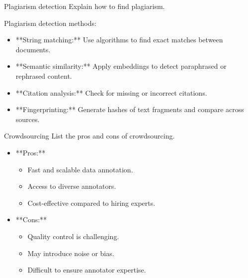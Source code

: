 \documentclass{article}
\begin{document}
\begin{exercise}{Plagiarism detection}
  Explain how to find plagiarism.

  \begin{solution}
    Plagiarism detection methods:
    \begin{itemize}
        \item **String matching:** Use algorithms to find exact matches between documents.
        \item **Semantic similarity:** Apply embeddings to detect paraphrased or rephrased content.
        \item **Citation analysis:** Check for missing or incorrect citations.
        \item **Fingerprinting:** Generate hashes of text fragments and compare across sources.
    \end{itemize}
  \end{solution}
\end{exercise}

\begin{exercise}{Crowdsourcing}
  List the pros and cons of crowdsourcing.

  \begin{solution}
    \begin{itemize}
        \item **Pros:**
        \begin{itemize}
            \item Fast and scalable data annotation.
            \item Access to diverse annotators.
            \item Cost-effective compared to hiring experts.
        \end{itemize}
        \item **Cons:**
        \begin{itemize}
            \item Quality control is challenging.
            \item May introduce noise or bias.
            \item Difficult to ensure annotator expertise.
        \end{itemize}
    \end{itemize}
  \end{solution}
\end{exercise}
\end{document}
